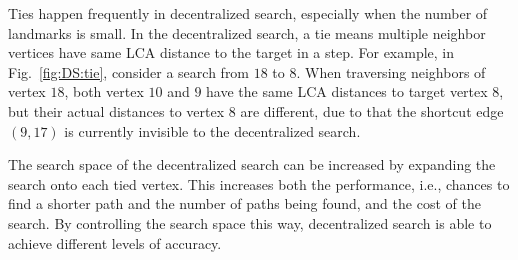 Ties happen frequently in decentralized search, especially when the number of landmarks is small. In the decentralized search, a tie means multiple neighbor vertices have same LCA distance to the target in a step. 
For example, in Fig.~\ref{fig:DS:tie}, consider a search from $18$ to $8$. When traversing neighbors of vertex $18$, both vertex $10$ and $9$ have the same LCA distances to target vertex $8$, but their actual distances to vertex $8$ are different, due to that the shortcut edge $(9, 17)$ is currently invisible to the decentralized search.

The search space of the decentralized search can be increased by expanding the search onto each tied vertex. This increases both the performance, i.e., chances to find a shorter path and the number of paths being found, and the cost of the search. By controlling the search space this way, decentralized search is able to achieve different levels of accuracy.



